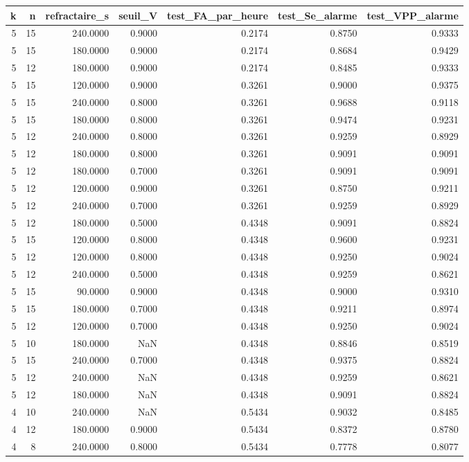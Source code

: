 \begin{tabular}{rrrrrrr}
\toprule
k & n & refractaire_s & seuil_V & test_FA_par_heure & test_Se_alarme & test_VPP_alarme \\
\midrule
5 & 15 & 240.0000 & 0.9000 & 0.2174 & 0.8750 & 0.9333 \\
5 & 15 & 180.0000 & 0.9000 & 0.2174 & 0.8684 & 0.9429 \\
5 & 12 & 180.0000 & 0.9000 & 0.2174 & 0.8485 & 0.9333 \\
5 & 15 & 120.0000 & 0.9000 & 0.3261 & 0.9000 & 0.9375 \\
5 & 15 & 240.0000 & 0.8000 & 0.3261 & 0.9688 & 0.9118 \\
5 & 15 & 180.0000 & 0.8000 & 0.3261 & 0.9474 & 0.9231 \\
5 & 12 & 240.0000 & 0.8000 & 0.3261 & 0.9259 & 0.8929 \\
5 & 12 & 180.0000 & 0.8000 & 0.3261 & 0.9091 & 0.9091 \\
5 & 12 & 180.0000 & 0.7000 & 0.3261 & 0.9091 & 0.9091 \\
5 & 12 & 120.0000 & 0.9000 & 0.3261 & 0.8750 & 0.9211 \\
5 & 12 & 240.0000 & 0.7000 & 0.3261 & 0.9259 & 0.8929 \\
5 & 12 & 180.0000 & 0.5000 & 0.4348 & 0.9091 & 0.8824 \\
5 & 15 & 120.0000 & 0.8000 & 0.4348 & 0.9600 & 0.9231 \\
5 & 12 & 120.0000 & 0.8000 & 0.4348 & 0.9250 & 0.9024 \\
5 & 12 & 240.0000 & 0.5000 & 0.4348 & 0.9259 & 0.8621 \\
5 & 15 & 90.0000 & 0.9000 & 0.4348 & 0.9000 & 0.9310 \\
5 & 15 & 180.0000 & 0.7000 & 0.4348 & 0.9211 & 0.8974 \\
5 & 12 & 120.0000 & 0.7000 & 0.4348 & 0.9250 & 0.9024 \\
5 & 10 & 180.0000 & NaN & 0.4348 & 0.8846 & 0.8519 \\
5 & 15 & 240.0000 & 0.7000 & 0.4348 & 0.9375 & 0.8824 \\
5 & 12 & 240.0000 & NaN & 0.4348 & 0.9259 & 0.8621 \\
5 & 12 & 180.0000 & NaN & 0.4348 & 0.9091 & 0.8824 \\
4 & 10 & 240.0000 & NaN & 0.5434 & 0.9032 & 0.8485 \\
4 & 12 & 180.0000 & 0.9000 & 0.5434 & 0.8372 & 0.8780 \\
4 & 8 & 240.0000 & 0.8000 & 0.5434 & 0.7778 & 0.8077 \\

\end{tabular}
